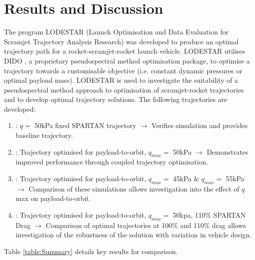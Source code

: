 \documentclass[]{aiaa-tc}
\begin{document}
\section{Results and Discussion} \label{section:results}
The program LODESTAR (Launch Optimisation and Data Evaluation for Scramjet Trajectory Analysis Research) was developed to produce an optimal trajectory path for a rocket-scramjet-rocket launch vehicle. LODESTAR utilises DIDO \cite{Ross,Ross2004}, a proprietary pseudospectral method optimisation package, to optimise a trajectory towards a customisable objective (i.e. constant dynamic pressures or optimal payload mass). 
LODESTAR is used to investigate the suitability of a pseudospectral method approach to optimisation of scramjet-rocket trajectories and to develop optimal trajectory solutions. The following trajectories are developed: 
\begin{enumerate}
	\item: $q = $ 50kPa fixed SPARTAN trajectory \newline$\rightarrow$ Verifies simulation and provides baseline trajectory.
	\item: Trajectory optimised for payload-to-orbit, $q_{max} = $ 50kPa \newline$\rightarrow$ Demonstrates improved performance through coupled trajectory optimisation.
	\item: Trajectory optimised for payload-to-orbit, $q_{max} = $ 45kPa \& $q_{max} = $ 55kPa \newline$\rightarrow$ Comparison of these simulations allows investigation into the effect of $q$ max on payload-to-orbit.
	\item: Trajectory optimised for payload-to-orbit,  $q_{max} = $ 50kpa, 110\% SPARTAN Drag \newline$\rightarrow$ Comparison of optimal trajectories at 100\% and 110\% drag allows investigation of the robustness of the solution with variation in vehicle design. 
\end{enumerate}

Table \ref{table:Summary} details key results for comparison. 
\end{document}
